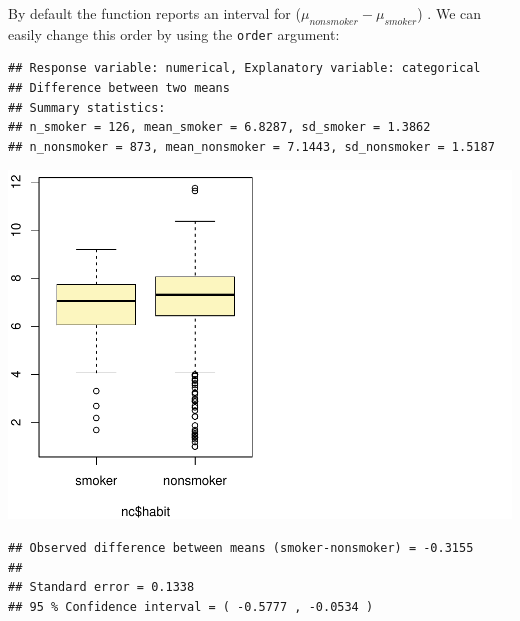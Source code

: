 \documentclass[]{article}
\newenvironment{Shaded}{\begin{snugshade}}{\end{snugshade}}
\newcommand{\KeywordTok}[1]{\textcolor[rgb]{0.13,0.29,0.53}{\textbf{#1}}}
\newcommand{\DataTypeTok}[1]{\textcolor[rgb]{0.13,0.29,0.53}{#1}}
\newcommand{\DecValTok}[1]{\textcolor[rgb]{0.00,0.00,0.81}{#1}}
\newcommand{\StringTok}[1]{\textcolor[rgb]{0.31,0.60,0.02}{#1}}
\newcommand{\OperatorTok}[1]{\textcolor[rgb]{0.81,0.36,0.00}{\textbf{#1}}}
\newcommand{\NormalTok}[1]{#1}
\begin{document}
By default the function reports an interval for
(\(\mu_{nonsmoker} - \mu_{smoker}\)) . We can easily change this order
by using the \texttt{order} argument:

\begin{Shaded}
\end{Shaded}

\begin{verbatim}
## Response variable: numerical, Explanatory variable: categorical
## Difference between two means
## Summary statistics:
## n_smoker = 126, mean_smoker = 6.8287, sd_smoker = 1.3862
## n_nonsmoker = 873, mean_nonsmoker = 7.1443, sd_nonsmoker = 1.5187
\end{verbatim}

\includegraphics{DATA_606_Lab_5_files/figure-latex/inf-weight-habit-ci-1.pdf}

\begin{verbatim}
## Observed difference between means (smoker-nonsmoker) = -0.3155
## 
## Standard error = 0.1338 
## 95 % Confidence interval = ( -0.5777 , -0.0534 )
\end{verbatim}
\end{document}
